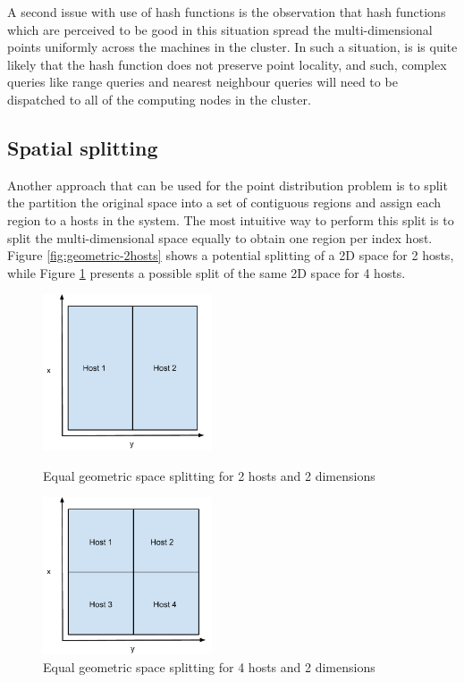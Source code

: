 \documentclass[11pt,a4paper]{globis-book}
\begin{document}
A second issue with use of hash functions is the observation that hash functions which are perceived to be good in this situation spread the multi-dimensional points uniformly across the machines in the cluster. In such a situation, is is quite likely that the hash function does not preserve point locality, and such, complex queries like range queries and nearest neighbour queries will need to be dispatched to all of the computing nodes in the cluster. 

\subsection{Spatial splitting}

Another approach that can be used for the point distribution problem is to split the partition the original space into a set of contiguous regions and assign each region to a hosts in the system. The most intuitive way to perform this split is to split the multi-dimensional space equally to obtain one region per index host. Figure \ref{fig:geometric-2hosts} shows a potential splitting of a 2D space for 2 hosts, while Figure \ref{fig:geometric-4hosts} presents a possible split of the same 2D space for 4 hosts. 

\begin{figure}
\centering
\parbox{5cm}{
    \includegraphics[width=5cm]{images/geometric-2hosts}
    \caption{Equal geometric space splitting for 2 hosts and 2 dimensions}
    \label{fig:geometric-2hosts}}
\qquad
\begin{minipage}{5cm}
    \includegraphics[width=5cm]{images/geometric-4hosts}
    \caption{Equal geometric space splitting for 4 hosts and 2 dimensions}
    \label{fig:geometric-4hosts}
\end{minipage}
\end{figure}
\end{document}
